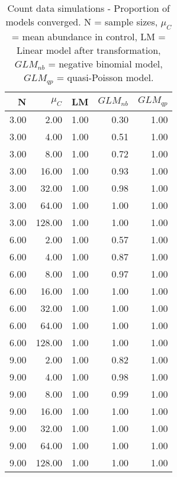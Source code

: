 \begin{table}[H]
\centering
\caption{Count data simulations - Proportion of models converged. N = sample sizes, 
             $\mu_C$ = mean abundance in control, LM = Linear model after transformation, 
             $GLM_{nb}$ = negative binomial model, $GLM_{qp}$ = quasi-Poisson model.} 
\label{tab:conv}
{\footnotesize
\begin{tabular}{rrrrr}
  \hline
N & $\mu_C$ & LM & $GLM_{nb}$ & $GLM_{qp}$ \\ 
  \hline
3.00 & 2.00 & 1.00 & 0.30 & 1.00 \\ 
  3.00 & 4.00 & 1.00 & 0.51 & 1.00 \\ 
  3.00 & 8.00 & 1.00 & 0.72 & 1.00 \\ 
  3.00 & 16.00 & 1.00 & 0.93 & 1.00 \\ 
  3.00 & 32.00 & 1.00 & 0.98 & 1.00 \\ 
  3.00 & 64.00 & 1.00 & 1.00 & 1.00 \\ 
  3.00 & 128.00 & 1.00 & 1.00 & 1.00 \\ 
  6.00 & 2.00 & 1.00 & 0.57 & 1.00 \\ 
  6.00 & 4.00 & 1.00 & 0.87 & 1.00 \\ 
  6.00 & 8.00 & 1.00 & 0.97 & 1.00 \\ 
  6.00 & 16.00 & 1.00 & 1.00 & 1.00 \\ 
  6.00 & 32.00 & 1.00 & 1.00 & 1.00 \\ 
  6.00 & 64.00 & 1.00 & 1.00 & 1.00 \\ 
  6.00 & 128.00 & 1.00 & 1.00 & 1.00 \\ 
  9.00 & 2.00 & 1.00 & 0.82 & 1.00 \\ 
  9.00 & 4.00 & 1.00 & 0.98 & 1.00 \\ 
  9.00 & 8.00 & 1.00 & 0.99 & 1.00 \\ 
  9.00 & 16.00 & 1.00 & 1.00 & 1.00 \\ 
  9.00 & 32.00 & 1.00 & 1.00 & 1.00 \\ 
  9.00 & 64.00 & 1.00 & 1.00 & 1.00 \\ 
  9.00 & 128.00 & 1.00 & 1.00 & 1.00 \\ 
   \hline
\end{tabular}
}
\end{table}

